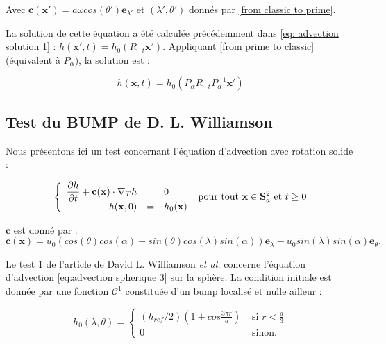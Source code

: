 Avec $\mathbf{c} ( \mathbf{x}' ) = a \omega cos ( \theta' ) \mathbf{e}_{\lambda'}$ et $(\lambda', \theta')$ donnés par \eqref{from classic to prime}.

La solution de cette équation a été calculée précédemment dans \eqref{eq: advection solution 1} : $h( \mathbf{x}', t )= h_0(  R_{-t} \mathbf{x}') $. Appliquant \eqref{from prime to classic} (équivalent à $P_{\alpha}$), la solution est :

\begin{equation}
\label{eq: advection solution 2}
h( \mathbf{x}, t ) = h_0(  P_{\alpha} R_{-t} P_{\alpha}^{-1} \mathbf{x}')
\end{equation}


\subsection{Test du BUMP de D. L. Williamson}

Nous présentons ici un test concernant l'équation d'advection avec rotation solide :

\begin{equation}
\label{eq:advection spherique 3}
\left\lbrace
\begin{array}{r cl}
\dfrac{\partial h}{\partial t} + \mathbf{c} ( \mathbf{x} ) \cdot \nabla_ T h & = & 0 \\
h(\mathbf{x},0) & = & h_0 ( \mathbf{x} )
\end{array}
\right. \text{ pour tout } \mathbf{x} \in \mathbf{S}_a^2 \text{ et } t \geq 0
\end{equation}

$\mathbf{c}$ est donné par :
$$\mathbf{c} ( \mathbf{x} ) = u_0 ( cos ( \theta) cos ( \alpha ) + sin( \theta) cos ( \lambda) sin( \alpha) ) \mathbf{e}_{\lambda} - u_0 sin( \lambda) sin( \alpha) \mathbf{e}_{\theta}. $$

Le test 1 de l'article de David L. Williamson \textit{et al.} \cite{Williamson1992} concerne l'équation d'advection \eqref{eq:advection spherique 3} sur la sphère. La condition initiale est donnée par une fonction $\mathcal{C}^1$ constituée d'un bump localisé et nulle ailleur :

\begin{equation}
h_0(\lambda, \theta) = 
\left\lbrace
\begin{array}{ll}
(h_{ref}/2) \left( 1+cos \frac{3 \pi r}{a} \right) & \text{ si } r<\frac{a}{3} \\
0 & \text{ sinon.}
\end{array}
\right.
\end{equation}

